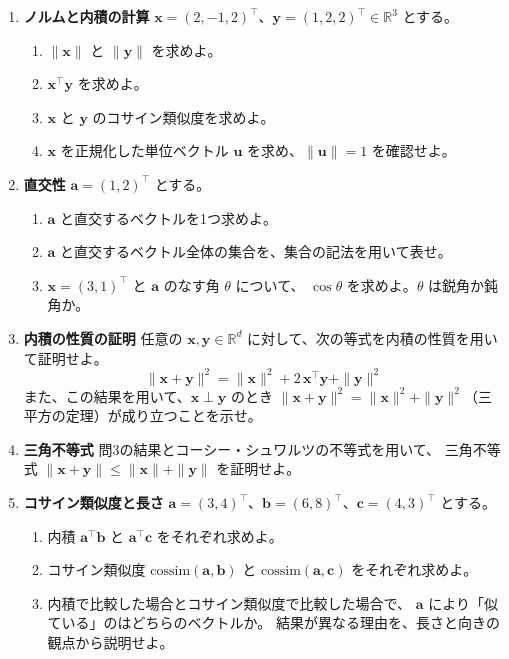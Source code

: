 \begin{enumerate}
  \item \textbf{ノルムと内積の計算}\quad
    $\bm{x} = (2, -1, 2)^\top$、$\bm{y} = (1, 2, 2)^\top \in \mathbb{R}^3$ とする。
    \begin{enumerate}
      \item $\|\bm{x}\|$ と $\|\bm{y}\|$ を求めよ。
      \item $\bm{x}^\top \bm{y}$ を求めよ。
      \item $\bm{x}$ と $\bm{y}$ のコサイン類似度を求めよ。
      \item $\bm{x}$ を正規化した単位ベクトル $\bm{u}$ を求め、$\|\bm{u}\| = 1$ を確認せよ。
    \end{enumerate}

  \item \textbf{直交性}\quad
    $\bm{a} = (1, 2)^\top$ とする。
    \begin{enumerate}
      \item $\bm{a}$ と直交するベクトルを1つ求めよ。
      \item $\bm{a}$ と直交するベクトル全体の集合を、集合の記法を用いて表せ。
      \item $\bm{x} = (3, 1)^\top$ と $\bm{a}$ のなす角 $\theta$ について、
        $\cos\theta$ を求めよ。$\theta$ は鋭角か鈍角か。
    \end{enumerate}

  \item \textbf{内積の性質の証明}\quad
    任意の $\bm{x}, \bm{y} \in \mathbb{R}^d$ に対して、次の等式を内積の性質を用いて証明せよ。
    \begin{equation*}
      \|\bm{x} + \bm{y}\|^2 = \|\bm{x}\|^2 + 2\,\bm{x}^\top \bm{y} + \|\bm{y}\|^2
    \end{equation*}
    また、この結果を用いて、$\bm{x} \perp \bm{y}$ のとき
    $\|\bm{x} + \bm{y}\|^2 = \|\bm{x}\|^2 + \|\bm{y}\|^2$（三平方の定理）が成り立つことを示せ。

  \item \textbf{三角不等式}\quad
    問3の結果とコーシー・シュワルツの不等式を用いて、
    三角不等式 $\|\bm{x} + \bm{y}\| \leq \|\bm{x}\| + \|\bm{y}\|$ を証明せよ。

  \item \textbf{コサイン類似度と長さ}\quad
    $\bm{a} = (3, 4)^\top$、$\bm{b} = (6, 8)^\top$、$\bm{c} = (4, 3)^\top$ とする。
    \begin{enumerate}
      \item 内積 $\bm{a}^\top \bm{b}$ と $\bm{a}^\top \bm{c}$ をそれぞれ求めよ。
      \item コサイン類似度 $\mathrm{cossim}(\bm{a}, \bm{b})$ と
        $\mathrm{cossim}(\bm{a}, \bm{c})$ をそれぞれ求めよ。
      \item 内積で比較した場合とコサイン類似度で比較した場合で、
        $\bm{a}$ により「似ている」のはどちらのベクトルか。
        結果が異なる理由を、長さと向きの観点から説明せよ。
    \end{enumerate}


\end{enumerate}
